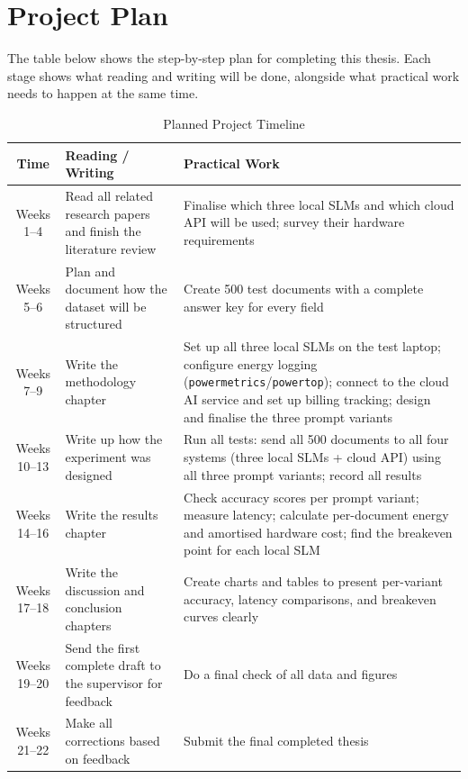 \section{Project Plan}
\label{sec:plan}

The table below shows the step-by-step plan for completing this thesis. Each stage shows what reading and writing will be done, alongside what practical work needs to happen at the same time.

\begin{table}[h!]
    \centering
    \begin{tabularx}{\textwidth}{ | c | X | X | }
        \hline
        \textbf{Time} & \textbf{Reading / Writing} & \textbf{Practical Work} \\
        \hline
        Weeks 1--4   & Read all related research papers and finish the literature review & Finalise which three local SLMs and which cloud API will be used; survey their hardware requirements \\
        \hline
        Weeks 5--6   & Plan and document how the dataset will be structured & Create 500 test documents with a complete answer key for every field \\
        \hline
        Weeks 7--9   & Write the methodology chapter & Set up all three local SLMs on the test laptop; configure energy logging (\texttt{powermetrics}/\texttt{powertop}); connect to the cloud AI service and set up billing tracking; design and finalise the three prompt variants \\
        \hline
        Weeks 10--13 & Write up how the experiment was designed & Run all tests: send all 500 documents to all four systems (three local SLMs + cloud API) using all three prompt variants; record all results \\
        \hline
        Weeks 14--16 & Write the results chapter & Check accuracy scores per prompt variant; measure latency; calculate per-document energy and amortised hardware cost; find the breakeven point for each local SLM \\
        \hline
        Weeks 17--18 & Write the discussion and conclusion chapters & Create charts and tables to present per-variant accuracy, latency comparisons, and breakeven curves clearly \\
        \hline
        Weeks 19--20 & Send the first complete draft to the supervisor for feedback & Do a final check of all data and figures \\
        \hline
        Weeks 21--22 & Make all corrections based on feedback & Submit the final completed thesis \\
        \hline
    \end{tabularx}
    \caption{Planned Project Timeline}
    \label{tab:timeline}
\end{table}

\newpage


